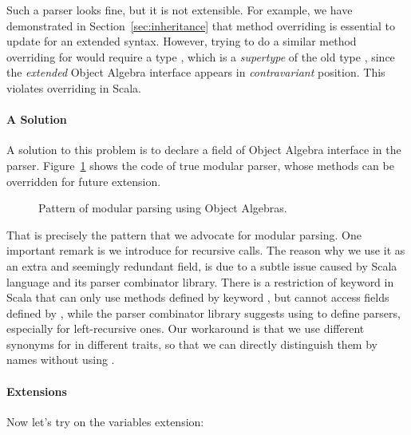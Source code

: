 \vspace{-4pt}
\vspace{-4pt}
Such a parser looks fine, but it is not extensible. For example, we have demonstrated in Section~\ref{sec:inheritance} that method overriding is essential to update  for an extended syntax. However, trying to do a similar method overriding for  would require a type  , which is a \emph{supertype} of the old type  , since
the \emph{extended} Object Algebra interface appears in \emph{contravariant} position. This violates
overriding in Scala.


\paragraph{A Solution}
A solution to this problem is to declare a field of Object Algebra interface
in the parser. Figure~\ref{fig:oa-parser} shows the code of true modular parser,
whose methods can be overridden for future extension.

\begin{figure}
  \caption{Pattern of modular parsing using Object Algebras.}
  \label{fig:oa-parser}
  \vspace{-0.2cm}
\end{figure}

That is precisely the pattern that we advocate for modular parsing.
One important remark is we introduce  for recursive calls.
The reason why we use it as an extra and seemingly redundant field, is due to a subtle issue caused by Scala language and its parser combinator library. There is a restriction of  keyword in Scala that  can only use methods defined by keyword , but cannot access fields defined by , while the parser combinator library suggests using  to define parsers, especially for left-recursive ones. Our workaround is that we use different synonyms for  in different traits, so that we can directly distinguish them by names without using .

\paragraph{Extensions}
Now let's try on the variables extension:

